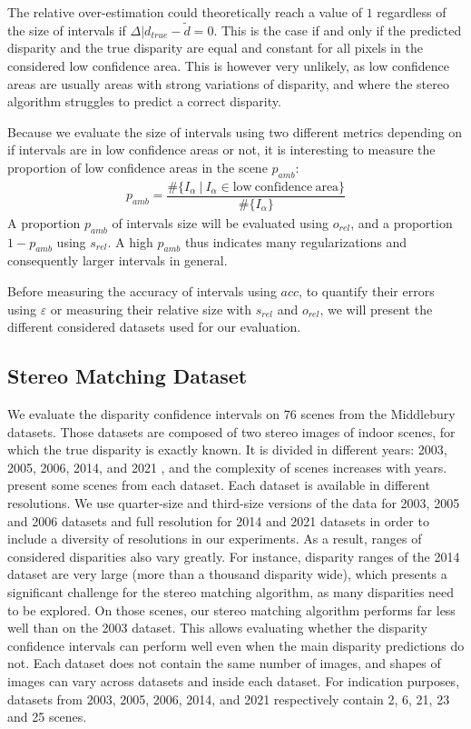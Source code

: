 \begin{remark}
    The relative over-estimation could theoretically reach a value of $1$ regardless of the size of intervals if $\Delta|d_{true}-\tilde{d}=0$. This is the case if and only if the predicted disparity and the true disparity are equal and constant for all pixels in the considered low confidence area. This is however very unlikely, as low confidence areas are usually areas with strong variations of disparity, and where the stereo algorithm struggles to predict a correct disparity.
\end{remark}

Because we evaluate the size of intervals using two different metrics depending on if intervals are in low confidence areas or not, it is interesting to measure the proportion of low confidence areas in the scene $p_{amb}$:
\begin{align}
    p_{amb} = \dfrac{\#\{I_\alpha ~|~I_\alpha\in\mathrm{low~confidence~area}\}}{\#\{I_\alpha\}}
\end{align}
A proportion $p_{amb}$ of intervals size will be evaluated using $o_{rel}$, and a proportion $1-p_{amb}$ using $s_{rel}$. A high $p_{amb}$ thus indicates many regularizations and consequently larger intervals in general.

Before measuring the accuracy of intervals using $acc$, to quantify their errors using $\varepsilon$ or measuring their relative size with $s_{rel}$ and $o_{rel}$, we will present the different considered datasets used for our evaluation.

\subsection{Stereo Matching Dataset}\label{sec:dataset}
We evaluate the disparity confidence intervals on $76$ scenes from the Middlebury datasets. Those datasets are composed of two stereo images of indoor scenes, for which the true disparity is exactly known. It is divided in different years: 2003, 2005, 2006, 2014, and 2021 \cite{scharstein_high-accuracy_2003, scharstein_learning_2007, hirschmuller_evaluation_2007, scharstein_high-resolution_2014}, and the complexity of scenes increases with years.  present some scenes from each dataset. Each dataset is available in different resolutions. We use quarter-size and third-size versions of the data for 2003, 2005 and 2006 datasets and full resolution for 2014 and 2021 datasets in order to include a diversity of resolutions in our experiments. As a result, ranges of considered disparities also vary greatly. For instance, disparity ranges of the 2014 dataset are very large (more than a thousand disparity wide), which presents a significant challenge for the stereo matching algorithm, as many disparities need to be explored. On those scenes, our stereo matching algorithm performs far less well than on the 2003 dataset. This allows evaluating whether the disparity confidence intervals can perform well even when the main disparity predictions do not. Each dataset does not contain the same number of images, and shapes of images can vary across datasets and inside each dataset. For indication purposes, datasets from 2003, 2005, 2006, 2014, and 2021 respectively contain 2, 6, 21, 23 and 25 scenes.

